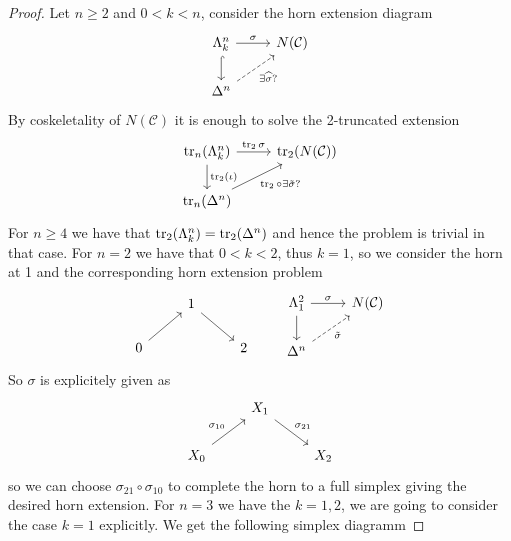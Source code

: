 \begin{proof}
    Let $n \geq 2$ and $0 < k <n$, consider the horn extension diagram
    \[
    \begin{tikzcd}
        \Lambda_k^n
        \arrow[r, "\sigma"]
        \arrow[d, hook]
        &
        N(\mathcal{C})
        \\
        \Delta^n
        \arrow[ur, dashed, "\exists \widehat{\sigma} ?"']
    \end{tikzcd}
    \]
    By coskeletality of $N(\mathcal{C})$ it is enough to solve the 2-truncated extension
    \[
    \begin{tikzcd}
        \tru_n(\Lambda_k^n)
        &
        \tru_2(N(\mathcal{C}))
        \\
        \tru_n(\Delta^n)
        \arrow[from=1-1, to=1-2, "\tru_2 \sigma"]
        \arrow[from=1-1, to=2-1, "\tru_2 (\iota)"]
        \arrow[from=2-1, to=1-2, "\tru_2 \circ \exists \Tilde{\sigma}?"']
    \end{tikzcd}    
    \]
    For $n \geq 4$ we have that $\operatorname{tr}_2(\Lambda_k^n)=\operatorname{tr}_2(\Delta^n)$ and hence the problem is trivial in that case.
    For $n=2$ we have that $0 < k < 2$, thus $k=1$, so we consider the horn at 1 and the corresponding horn extension problem
    \[
    \begin{tikzcd}
        &
        1
        &
        \\
        0
        &&
        2
        \arrow[from=2-1, to=1-2]
        \arrow[from=1-2, to=2-3]
    \end{tikzcd}
    \qquad
    \begin{tikzcd}
        \Lambda_1^2
        &
        N(\mathcal{C})
        \\
        \Delta^n
        \arrow[from=1-1, to=1-2, "\sigma"]
        \arrow[from=1-1, to=2-1]
        \arrow[from=2-1, to=1-2,dashed,"\Tilde{\sigma}"']
    \end{tikzcd}
    \]
    So $\sigma$ is explicitely given as 
    \[
    \begin{tikzcd}
        &
        X_1
        &
        \\
        X_0
        &&
        X_2
        \arrow[from=2-1, to=1-2,"\sigma_{10}"]
        \arrow[from=1-2, to=2-3,"\sigma_{21}"]
    \end{tikzcd}
    \] 
    so we can choose $\sigma_{21}\circ\sigma_{10}$ to complete the horn to a full simplex giving the desired horn extension.
    For $n=3$ we have the $k=1,2$, we are going to consider the case $k=1$ explicitly. 
    We get the following simplex diagramm

\end{proof}
